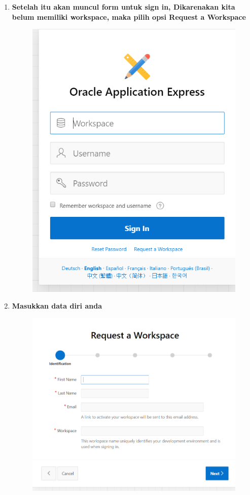 \begin{enumerate}
\item \textbf{Setelah itu akan muncul form untuk sign in, Dikarenakan kita belum memiliki workspace, maka pilih opsi \textbf{Request a Workspace}}
\begin{figure}[H]
    \centering
    \includegraphics[scale=0.3]{figures/2.png}
    \label{2}
\end{figure}

\item \textbf{Masukkan data diri anda}
\begin{figure}[H]
    \centering
    \includegraphics[scale=0.3]{figures/3.png}
    \label{3}
\end{figure}



\end{enumerate}
